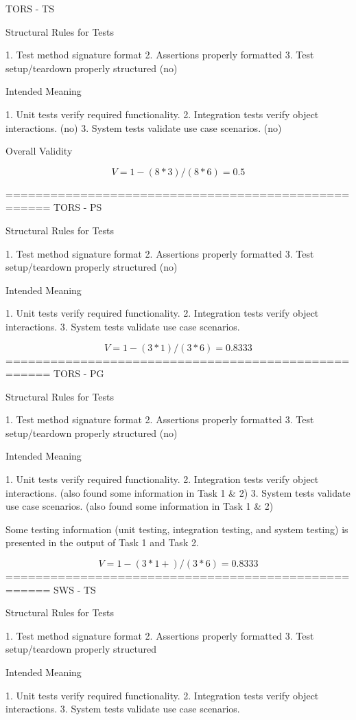 TORS - TS

Structural Rules for Tests

1. Test method signature format
2. Assertions properly formatted
3. Test setup/teardown properly structured (no) 

Intended Meaning

1. Unit tests verify required functionality.
2. Integration tests verify object interactions. (no) 
3. System tests validate use case scenarios. (no) 

Overall Validity

$$
V = 1 - (8*3)/(8*6) = 0.5
$$

====================================================
TORS - PS

Structural Rules for Tests

1. Test method signature format
2. Assertions properly formatted
3. Test setup/teardown properly structured (no)

Intended Meaning

1. Unit tests verify required functionality.
2. Integration tests verify object interactions. 
3. System tests validate use case scenarios. 

$$
V = 1 - (3*1)/(3*6) = 0.8333
$$
====================================================
TORS - PG

Structural Rules for Tests

1. Test method signature format
2. Assertions properly formatted
3. Test setup/teardown properly structured (no)

Intended Meaning

1. Unit tests verify required functionality.
2. Integration tests verify object interactions. (also found some information in Task 1 & 2)
3. System tests validate use case scenarios. (also found some information in Task 1 & 2)

Some testing information (unit testing, integration testing, and system testing) is presented in the output of Task 1 and Task 2. 

$$
V = 1 - (3*1+)/(3*6) = 0.8333
$$
====================================================
SWS - TS

Structural Rules for Tests

1. Test method signature format
2. Assertions properly formatted
3. Test setup/teardown properly structured

Intended Meaning

1. Unit tests verify required functionality.
2. Integration tests verify object interactions.
3. System tests validate use case scenarios. 

